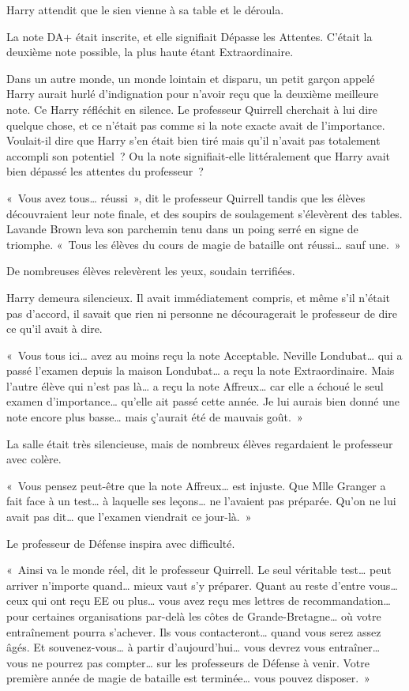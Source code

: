 Harry attendit que le sien vienne à sa table et le déroula.

La note DA+ était inscrite, et elle signifiait Dépasse les Attentes.
C'était la deuxième note possible, la plus haute étant Extraordinaire.

Dans un autre monde, un monde lointain et disparu, un petit garçon appelé Harry aurait hurlé d'indignation pour n'avoir reçu que la deuxième meilleure note.
Ce Harry réfléchit en silence.
Le professeur Quirrell cherchait à lui dire quelque chose, et ce n'était pas comme si la note exacte avait de l'importance.
Voulait-il dire que Harry s'en était bien tiré mais qu'il n'avait pas totalement accompli son potentiel~?
Ou la note signifiait-elle littéralement que Harry avait bien dépassé les attentes du professeur~?

«~Vous avez tous… réussi~», dit le professeur Quirrell tandis que les élèves découvraient leur note finale, et des soupirs de soulagement s'élevèrent des tables.
Lavande Brown leva son parchemin tenu dans un poing serré en signe de triomphe.
«~Tous les élèves du cours de magie de bataille ont réussi… sauf une.~»

De nombreuses élèves relevèrent les yeux, soudain terrifiées.

Harry demeura silencieux.
Il avait immédiatement compris, et même s'il n'était pas d'accord, il savait que rien ni personne ne découragerait le professeur de dire ce qu'il avait à dire.

«~Vous tous ici… avez au moins reçu la note Acceptable.
Neville Londubat… qui a passé l'examen depuis la maison Londubat… a reçu la note Extraordinaire.
Mais l'autre élève qui n'est pas là… a reçu la note Affreux… car elle a échoué le seul examen d'importance… qu'elle ait passé cette année.
Je lui aurais bien donné une note encore plus basse… mais ç'aurait été de mauvais goût.~»

La salle était très silencieuse, mais de nombreux élèves regardaient le professeur avec colère.

«~Vous pensez peut-être que la note Affreux… est injuste.
Que Mlle Granger a fait face à un test… à laquelle ses leçons… ne l'avaient pas préparée.
Qu'on ne lui avait pas dit… que l'examen viendrait ce jour-là.~»

Le professeur de Défense inspira avec difficulté.

«~Ainsi va le monde réel, dit le professeur Quirrell.
Le seul véritable test… peut arriver n'importe quand… mieux vaut s'y préparer.
Quant au reste d'entre vous… ceux qui ont reçu EE ou plus… vous avez reçu mes lettres de recommandation… pour certaines organisations par-delà les côtes de Grande-Bretagne… où votre entraînement pourra s'achever.
Ils vous contacteront… quand vous serez assez âgés.
Et souvenez-vous… à partir d'aujourd'hui… vous devrez vous entraîner… vous ne pourrez pas compter… sur les professeurs de Défense à venir.
Votre première année de magie de bataille est terminée… vous pouvez disposer.~»

